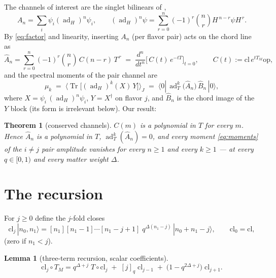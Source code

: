 \documentclass[11pt]{article}
\newtheorem{lemma}{Lemma}
\newtheorem{theorem}{Theorem}
\newcommand{\Tr}{\operatorname{Tr}}
\newcommand{\ad}{\operatorname{ad}}
\newcommand{\cl}{\mathrm{cl}}
\newcommand{\op}{\mathrm{op}}
\begin{document}
The channels of interest are the singlet bilinears of \cite{MSS2607},
\begin{equation}
A_n=\sum_i\psi_i(\ad_H)^n\psi_i,
\qquad
(\ad_H)^n\psi=\sum_{r=0}^{n}(-1)^r\binom{n}{r}H^{\,n-r}\psi H^{\,r}.
\end{equation}
By \eqref{eq:factor} and linearity, inserting $A_n$ (per flavor pair) acts
on the chord line as
\begin{equation}
\widehat A_n=\sum_{r=0}^{n}(-1)^r\binom{n}{r}\,C(n-r)\,T^{\,r}
\;=\;\frac{d^n}{dt^n}\Big[\,C(t)\,e^{-tT}\Big]_{t=0},
\qquad C(t):=\cl\,e^{tT_M}\op ,
\label{eq:Ahat}
\end{equation}
and the spectral moments of the pair channel are
\begin{equation}
\mu_k \;=\; \big\langle\Tr\big[(\ad_H)^k(X)\,Y\big]\big\rangle_J
\;=\;\langle0|\,\ad_T^k\big(\widehat A_n\big)\,\widehat B_n\,|0\rangle ,
\label{eq:moments}
\end{equation}
where $X=\psi_i\,(\ad_H)^n\psi_i$, $Y=X^\dagger$ on flavor $j$, and
$\widehat B_n$ is the chord image of the $Y$ block (its form is irrelevant
below). Our result:

\begin{theorem}[conserved channels]
$C(m)$ is a polynomial in $T$ for every $m$. Hence $\widehat A_n$ is a
polynomial in $T$, $\ad_T^k(\widehat A_n)=0$, and every moment
\eqref{eq:moments} of the $i\neq j$ pair amplitude vanishes for every
$n\ge1$ and every $k\ge1$ --- at every $q\in[0,1)$ and every matter
weight $\Delta$.
\end{theorem}

\section{The recursion}

For $j\ge0$ define the $j$-fold closes
\begin{equation}
\cl_j\,|n_0,n_1\rangle
=[n_1][n_1{-}1]\cdots[n_1{-}j{+}1]\;q^{\Delta(n_1-j)}\,|n_0+n_1-j\rangle ,
\qquad \cl_0=\cl ,
\end{equation}
(zero if $n_1<j$).

\begin{lemma}[three-term recursion, scalar coefficients]
\begin{equation}
\cl_j\circ T_M
=q^{\Delta+j}\;T\circ \cl_j
\;+\;[j]_q\;\cl_{j-1}
\;+\;\big(1-q^{2\Delta+j}\big)\;\cl_{j+1}.
\label{eq:rec}
\end{equation}
\end{lemma}
\end{document}
